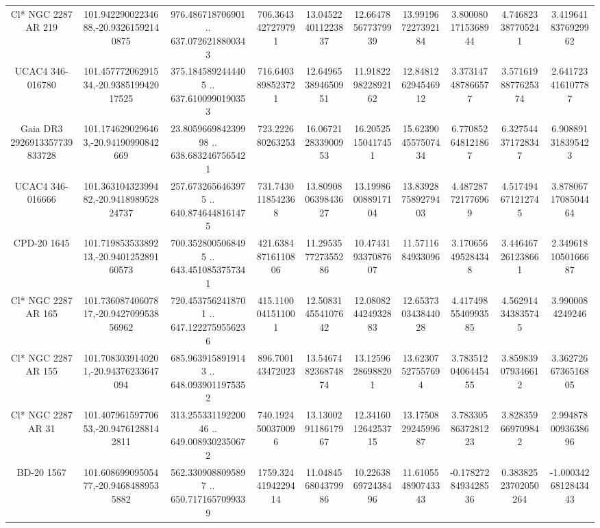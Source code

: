 \begin{table}
\begin{tabular}{cccccccccc}
Cl* NGC 2287     AR     219 & 101.94229002234688,-20.93261592140875 & 976.486718706901 .. 637.0726218800343 & 706.3643427279791 & 13.045224011223837 & 12.664785677379939 & 13.991967227392184 & 3.8000801715368944 & 4.746823387705241 & 3.4196418376929962 \\
UCAC4 346-016780 & 101.45777206291534,-20.938519942017525 & 375.1845892444405 .. 637.6100990190353 & 716.6403898523721 & 12.649653894650951 & 11.918229822892162 & 12.848126294546912 & 3.373147487866577 & 3.5716198877625374 & 2.641723416107787 \\
Gaia DR3 2926913357739833728 & 101.1746290296463,-20.94190990842669 & 23.805966984239998 .. 638.6832467565421 & 723.222680263253 & 16.067212833900953 & 16.20525150417451 & 15.623904557507434 & 6.770852648121867 & 6.327544371728347 & 6.908891318395423 \\
UCAC4 346-016666 & 101.36310432399482,-20.941898952824737 & 257.6732656463975 .. 640.8746448161475 & 731.7430118542368 & 13.809080639843627 & 13.199860088917104 & 13.839287589279403 & 4.487287721776969 & 4.517494671212745 & 3.8780671708504464 \\
CPD-20  1645 & 101.71985353389213,-20.940125289160573 & 700.3528005068495 .. 643.4510853757341 & 421.63848716110806 & 11.295357727355286 & 10.474319337087607 & 11.5711684933096 & 3.170656495284348 & 3.446467261238661 & 2.3496181050166687 \\
Cl* NGC 2287     AR     165 & 101.73608740607817,-20.942709953856962 & 720.4537562418701 .. 647.1222759556236 & 415.1100041511001 & 12.508314554107642 & 12.080824424932883 & 12.653730343844028 & 4.4174985540993585 & 4.562914343835745 & 3.9900084249246 \\
Cl* NGC 2287     AR     155 & 101.7083039140201,-20.94376233647094 & 685.9639158919143 .. 648.0939011975352 & 896.700143472023 & 13.546748236874874 & 13.12596286988201 & 13.62307527557694 & 3.7835120406445455 & 3.859839079346612 & 3.3627266736516805 \\
Cl* NGC 2287     AR      31 & 101.40796159770653,-20.94761288142811 & 313.25533119220046 .. 649.0089302350672 & 740.1924500370096 & 13.130029118617967 & 12.341601264253715 & 13.175082924599687 & 3.7833058637281223 & 3.828359669709842 & 2.9948780093638696 \\
BD-20  1567 & 101.60869909505477,-20.94684889535882 & 562.3309088095897 .. 650.7171657099339 & 1759.3244194229414 & 11.048456804379986 & 10.226386972438496 & 11.610554890743343 & -0.1782728493428536 & 0.38382523702050264 & -1.0003426812843443 \\

\end{tabular}
\end{table}
